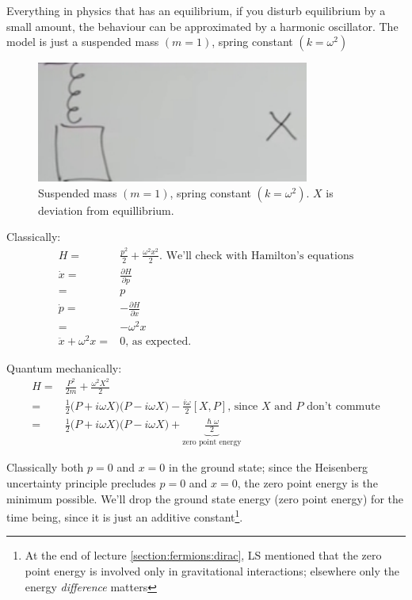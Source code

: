 \documentclass[]{article}
\begin{document}
Everything in physics that has an equilibrium, if you disturb equilibrium by a small amount, the behaviour can be approximated by a  harmonic oscillator. The model is just a suspended mass $(m=1)$, spring constant $(k=\omega^2)$

\begin{figure}[H]
	\begin{center}
		\caption[Suspended mass.]{Suspended mass $(m=1)$, spring constant $(k=\omega^2)$.  $X$ is deviation from equillibrium.}\label{fig:aqm-3-shm-suspended-mass}
		\includegraphics[width=0.8\textwidth]{aqm-3-shm-suspended-mass}
	\end{center}
\end{figure}

Classically:
\begin{align*}
	H =& \frac{p^2}{2} + \frac{\omega^2 x^2}{2} \text{. We'll check with Hamilton's equations}\\
	 \dot{x}=&\frac{\partial H}{\partial p} \\
	 =&p\\
	 \dot{p}=&-\frac{\partial H}{\partial x} \\
	=& - \omega^2 x \\
	\ddot{x} + \omega^2 x =&0 \text{, as expected.}
\end{align*}

Quantum mechanically:
\begin{align*}
	H =& \frac{P^2}{2m} + \frac{\omega^2 X^2}{2}\\
	=& \frac{1}{2}\big(P + i \omega X \big)\big(P - i \omega X \big) - \frac{i \omega}{2} [X,P] \text{, since $X$ and $P$ don't commute}\\
	=& \frac{1}{2}\big(P + i \omega X \big)\big(P - i \omega X \big) + \underbrace{\frac{\hslash \omega}{2}}_\text{zero point energy}
\end{align*}

Classically both $p=0$ and $x=0$ in the ground state; since the Heisenberg uncertainty principle precludes  $p=0$ and $x=0$, the zero point energy is the minimum possible. We'll drop the ground state energy (zero point energy) for the time being, since it is just an additive constant\footnote{At the end of lecture \ref{section:fermions:dirac}, LS mentioned that the zero point energy is involved only in gravitational interactions; elsewhere only the energy \emph{difference} matters}.
\end{document}
